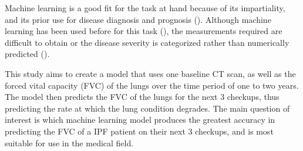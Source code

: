 \documentclass[12pt]{article}
\begin{document}
Machine learning is a good fit for the task at hand because of its impartiality, and its prior use for disease diagnosis and prognosis (\cite{wang2010high}). 
Although machine learning has been used before for this task (\cite{robbie2017evaluating,du20146,maldonado2014automated}), the measurements required are difficult to obtain or the disease severity is categorized rather than numerically predicted (\cite{walsh2018deep}).





This study aims to create a model that uses one baseline CT scan, as well as the forced vital capacity (FVC) of the lungs over the time period of one to two years.
The model then predicts the FVC of the lungs for the next 3 checkups, thus predicting the rate at which the lung condition degrades. 
The main question of interest is which machine learning model produces the greatest accuracy in predicting the FVC of a IPF patient on their next 3 checkups, and is most suitable for use in the medical field.

\end{document}
